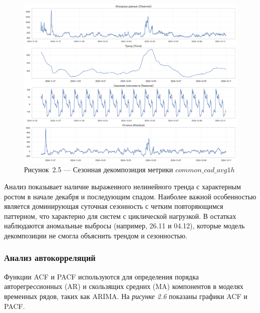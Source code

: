 \begin{figure}[H]
	\centering
	\includegraphics[width=\textwidth]{figures/chapter2/seasonal_decomposition.png}
	\caption*{Рисунок~2.5 --- Сезонная декомпозиция метрики $common\_cad\_avg1h$}
	\label{fig:seasonal_decomposition}
\end{figure}

\hspace*{1.25cm}Анализ показывает наличие выраженного нелинейного тренда с характерным ростом в начале декабря и последующим спадом. Наиболее важной особенностью является доминирующая суточная сезонность с четким повторяющимся паттерном, что характерно для систем с циклической нагрузкой. В остатках наблюдаются аномальные выбросы (например, 26.11 и 04.12), которые модель декомпозиции не смогла объяснить трендом и сезонностью.

\subsubsection{Анализ автокорреляций}

\hspace*{1.25cm}Функции ACF и PACF используются для определения порядка авторегрессионных (AR) и скользящих средних (MA) компонентов в моделях временных рядов, таких как ARIMA. На \textit{рисунке 2.6} показаны графики ACF и PACF.

